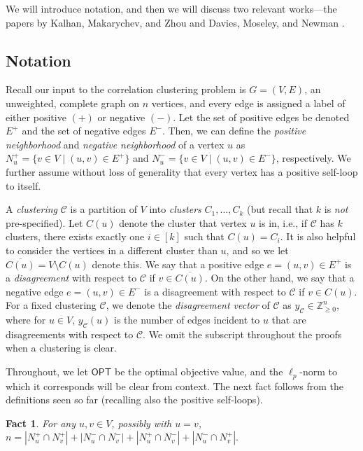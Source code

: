 \documentclass[11pt]{article}
\newtheorem{fact}{Fact}
\begin{document}
We will introduce notation, 
and then we will discuss two relevant works---the papers by 
Kalhan, Makarychev, and Zhou \citeyearpar{KMZ19} and Davies, Moseley, and Newman \citeyearpar{DMN23}.

\subsection{Notation} \label{sec: notation}
Recall our input to the correlation clustering problem is 
$G=(V,E)$, an unweighted, complete graph on $n$ vertices, 
and every edge is assigned a label of either positive $(+)$ or negative $(-)$.
Let the set of positive edges be denoted $E^+$ and the set of negative edges $E^-$.
Then, we can define the \emph{positive neighborhood} and \emph{negative neighborhood} of a vertex $u$ as $N_u^+ =\{v\in V \mid (u,v) \in E^+\}$ and $N_u^- =\{v\in V \mid (u,v) \in E^-\}$, respectively.
We further assume without loss of generality that every vertex has a positive self-loop to itself.

A \emph{clustering} $\mathcal{C}$ is a partition of $V$ into \emph{clusters} $C_1,\ldots,C_k$ (but recall that $k$ is \textit{not} pre-specified). 
Let $C(u)$ denote the cluster that vertex $u$ is in, i.e., if $\mathcal{C}$ has $k$ clusters, there exists exactly one $i \in [k]$ such that $C(u) = C_i$.
It is also helpful to consider the vertices in a different cluster than $u$, and so we let $\overline{C(u)} = V \setminus C(u)$ denote this.
We say that a positive edge $e=(u,v) \in E^+$ is a \emph{disagreement} with respect to $\mathcal{C}$ if $v \in \overline{C(u)}$. On the other hand, we say that a negative edge $e=(u,v) \in E^-$ is a disagreement with respect to $\mathcal{C}$ if $v \in C(u)$.
For a fixed clustering $\mathcal{C}$, we denote the \emph{disagreement vector} of $\mathcal{C}$ as $y_{\mathcal{C}} \in \mathbb{Z}_{\geq 0}^n$, where for $u \in V$, $y_{\mathcal{C}}(u)$ is the number of edges incident to $u$ that are disagreements with respect to $\mathcal{C}$. We omit the subscript throughout the proofs when a clustering is clear.

Throughout, we let $\textsf{OPT}$ be the optimal objective value, 
and the $\ell_p$-norm to which it corresponds will be clear from context.
The next fact follows from the definitions seen so far (recalling also the positive self-loops). 



\begin{fact} \label{pairwise_intersections}
For any $u,v \in V$, possibly with $u=v$, $n = |N_u^+ \cap N_v^+| + |N_u^- \cap N_v^-| + |N_u^+ \cap N_v^-| + |N_u^- \cap N_v^+|.$
\end{fact}
\end{document}
